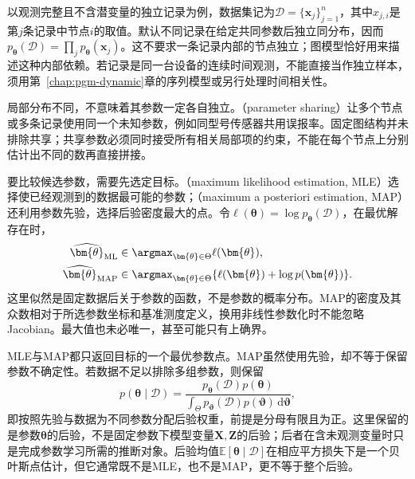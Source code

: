 以观测完整且不含潜变量的独立记录为例，数据集记为$\mathcal{D}=\{\bm{x}_j\}_{j=1}^n$，其中$x_{j,i}$是第$j$条记录中节点$i$的取值。默认不同记录在给定共同参数后独立同分布，因而$p_{\bm{\theta}}(\mathcal{D})=\prod_jp_{\bm{\theta}}(\bm{x}_j)$。这不要求一条记录内部的节点独立；图模型恰好用来描述这种内部依赖。若记录是同一台设备的连续时间观测，不能直接当作独立样本，须用第~\ref{chap:pgm-dynamic}章的序列模型或另行处理时间相关性。

局部分布不同，不意味着其参数一定各自独立。（parameter sharing）让多个节点或多条记录使用同一个未知参数，例如同型号传感器共用误报率。固定图结构并未排除共享；共享参数必须同时接受所有相关局部项的约束，不能在每个节点上分别估计出不同的数再直接拼接。

要比较候选参数，需要先选定目标。（maximum likelihood estimation, MLE）选择使已经观测到的数据最可能的参数；（maximum a posteriori estimation, MAP）还利用参数先验，选择后验密度最大的点。令$\ell(\bm{\theta})=\log p_{\bm{\theta}}(\mathcal{D})$，在最优解存在时，
\begin{equation}
  \begin{aligned}
    \widehat{\bm{\theta}}_{\mathrm{ML}}
      &\in\argmax_{\bm{\theta}\in\Theta}\ell(\bm{\theta}),\\
    \widehat{\bm{\theta}}_{\mathrm{MAP}}
      &\in\argmax_{\bm{\theta}\in\Theta}
        \{\ell(\bm{\theta})+\log p(\bm{\theta})\}.
  \end{aligned}
  \label{eq:pgm-parameter-learning-point-objectives}
\end{equation}
这里似然是固定数据后关于参数的函数，不是参数的概率分布。MAP的密度及其众数相对于所选参数坐标和基准测度定义，换用非线性参数化时不能忽略Jacobian。最大值也未必唯一，甚至可能只有上确界。

MLE与MAP都只返回目标的一个最优参数点。MAP虽然使用先验，却不等于保留参数不确定性。若数据不足以排除多组参数，则保留
\begin{equation}
  p(\bm{\theta}\mid\mathcal{D})
  =\frac{p_{\bm{\theta}}(\mathcal{D})p(\bm{\theta})}
  {\int_\Theta p_{\bm{\vartheta}}(\mathcal{D})
    p(\bm{\vartheta})\,\mathrm{d}\bm{\vartheta}},
  \label{eq:pgm-parameter-learning-parameter-posterior}
\end{equation}
即按照先验与数据为不同参数分配后验权重，前提是分母有限且为正。这里保留的是参数$\bm{\theta}$的后验，不是固定参数下模型变量$\bm{X},\bm{Z}$的后验；后者在含未观测变量时只是完成参数学习所需的推断对象。后验均值$\mathbb{E}[\bm{\theta}\mid\mathcal{D}]$在相应平方损失下是一个贝叶斯点估计，但它通常既不是MLE，也不是MAP，更不等于整个后验。

